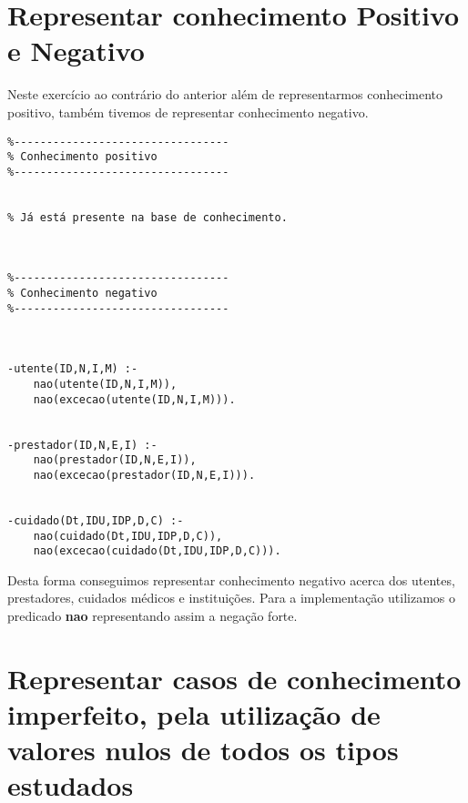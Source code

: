 \documentclass{report}
\begin{document}
\section{Representar conhecimento Positivo e Negativo}

Neste exercício ao contrário do anterior além de representarmos conhecimento positivo, também tivemos de representar conhecimento negativo.

\begin{verbatim}
%---------------------------------
% Conhecimento positivo
%---------------------------------


% Já está presente na base de conhecimento.



%---------------------------------
% Conhecimento negativo 
%---------------------------------



-utente(ID,N,I,M) :-
    nao(utente(ID,N,I,M)),
    nao(excecao(utente(ID,N,I,M))).


-prestador(ID,N,E,I) :-
    nao(prestador(ID,N,E,I)),
    nao(excecao(prestador(ID,N,E,I))).


-cuidado(Dt,IDU,IDP,D,C) :-
    nao(cuidado(Dt,IDU,IDP,D,C)),
    nao(excecao(cuidado(Dt,IDU,IDP,D,C))).
\end{verbatim}

Desta forma conseguimos representar conhecimento negativo acerca dos utentes, prestadores, cuidados médicos e instituições. Para a implementação utilizamos o predicado \textbf{nao} representando assim a negação forte.






































\section{Representar casos de conhecimento imperfeito, pela utilização de valores nulos de todos os tipos estudados}
\end{document}
